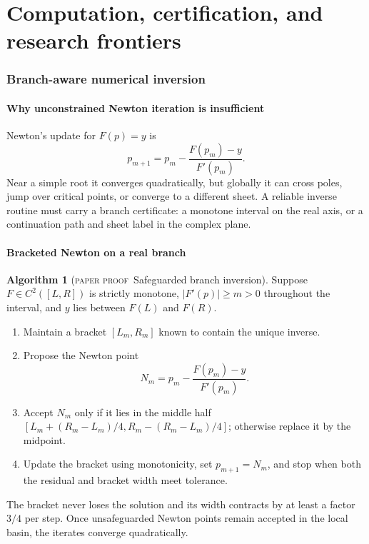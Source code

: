 \documentclass[11pt,oneside]{article}
\theoremstyle{definition}
\newtheorem{algorithm}[theorem]{Algorithm}
\theoremstyle{remark}
\theoremstyle{plain}
\theoremstyle{definition}
\theoremstyle{remark}
\newcommand{\statusproved}{\textcolor{provedgreen}{\textsc{paper proof}}}
\numberwithin{equation}{section}
\numberwithin{figure}{section}
\numberwithin{table}{section}
\let\reporttopsection\section
\let\reportsubsection\subsection
\let\reportsubsubsection\subsubsection
\let\chapter\reporttopsection
\let\section\reportsubsection
\let\subsection\reportsubsubsection
\begin{document}
\part{Computation, certification, and research frontiers}

\chapter{Branch-aware numerical inversion}

\section{Why unconstrained Newton iteration is insufficient}
Newton's update for \(F(p)=y\) is
\[
 p_{m+1}=p_m-\frac{F(p_m)-y}{F'(p_m)}.
\]
Near a simple root it converges quadratically, but globally it can cross poles,
jump over critical points, or converge to a different sheet.  A reliable
inverse routine must carry a branch certificate: a monotone interval on the
real axis, or a continuation path and sheet label in the complex plane.

\section{Bracketed Newton on a real branch}
\begin{algorithm}[\statusproved\ Safeguarded branch inversion]
Suppose \(F\in C^2([L,R])\) is strictly monotone,
\(\lvert F'(p)\rvert\ge m>0\) throughout the interval, and \(y\) lies between
\(F(L)\) and \(F(R)\).
\begin{enumerate}[label=\arabic*.]
\item Maintain a bracket \([L_m,R_m]\) known to contain the unique inverse.
\item Propose the Newton point
\[
 N_m=p_m-\frac{F(p_m)-y}{F'(p_m)}.
\]
\item Accept \(N_m\) only if it lies in the middle half
\([L_m+(R_m-L_m)/4,R_m-(R_m-L_m)/4]\); otherwise replace it by the midpoint.
\item Update the bracket using monotonicity, set \(p_{m+1}=N_m\), and stop when
both the residual and bracket width meet tolerance.
\end{enumerate}
The bracket never loses the solution and its width contracts by at least a
factor \(3/4\) per step.  Once unsafeguarded Newton points remain accepted in
the local basin, the iterates converge quadratically.
\end{algorithm}
\end{document}
